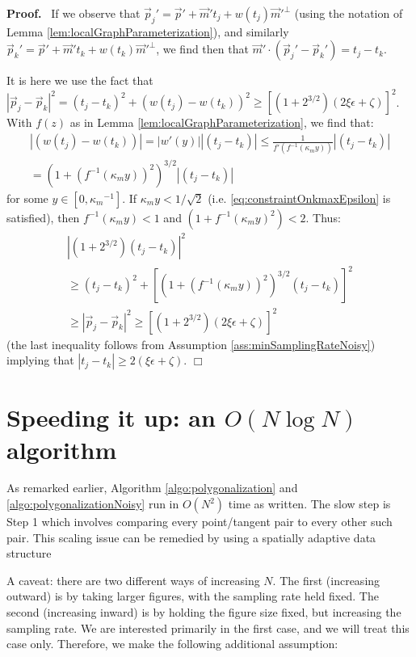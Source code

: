 \documentclass{article}
\newenvironment{proof}{
  \noindent\textbf{Proof.}\ }{\hspace*{\fill}
  \begin{math}\Box\end{math}\medskip}
\numberwithin{cntr}{section}
\numberwithin{equation}{section}
\newcommand{\abs}[1]{\left| #1 \right|}%
\newcommand{\vp}[0]{{\vec{p}}}
\newcommand{\vm}[0]{{\vec{m}}}
\newcommand{\curvemax}{{\kappa_{m}}}
\newcommand{\curvemaxi}{{\curvemax^{-1}}}
\newcommand{\pointNoise}{{\zeta}}
\newcommand{\tanNoise}{{\xi}}
\begin{document}
\begin{proof}
If we observe that $\vp_{j}' = \vp' + \vm' t_{j} + w(t_{j}) \vm'^{\perp}$ (using the notation of Lemma \ref{lem:localGraphParameterization}), and similarly $\vp_{k}' = \vp' + \vm' t_{k} + w(t_{k}) \vm'^{\perp}$, we find then that $\vm' \cdot (\vp_{j}'-\vp_{k}') = t_{j}-t_{k}$.

It is here we use the fact that $\abs{\vp_{j} - \vp_{k}}^{2} = (t_{j}-t_{k})^{2} + (w(t_{j})-w(t_{k}))^{2} \geq [(1+2^{3/2})(2 \tanNoise \epsilon + \pointNoise)]^{2}$. With $f(z)$ as in Lemma \ref{lem:localGraphParameterization}, we find that:
\begin{multline*}
  \abs{(w(t_{j})-w(t_{k}))} = \abs{w'(y)}\abs{(t_{j}-t_{k})} \leq \frac{1}{f'(f^{-1}(\curvemax y))} \abs{(t_{j}-t_{k})} \\
  = (1+(f^{-1}(\curvemax y))^{2})^{3/2} \abs{(t_{j}-t_{k} )}
\end{multline*}
for some $y \in [0,\curvemaxi]$. If $\curvemax y < 1/\sqrt{2}$ (i.e. \eqref{eq:constraintOnkmaxEpsilon} is satisfied), then $f^{-1}(\curvemax y) < 1$ and $(1+f^{-1}(\curvemax y)^{2}) < 2$. Thus:
\begin{multline}
  \abs{(1+2^{3/2})(t_{j}-t_{k})}^{2} \\
  \geq (t_{j}-t_{k})^{2} + [(1+(f^{-1}(\curvemax y))^{2})^{3/2} (t_{j}-t_{k} )]^{2} \\
  \geq \abs{\vp_{j} - \vp_{k}}^{2}  \geq [(1+2^{3/2})(2 \tanNoise \epsilon + \pointNoise)]^{2}
\end{multline}
(the last inequality follows from Assumption \ref{ass:minSamplingRateNoisy}) implying that $\abs{t_{j}-t_{k}} \geq 2(\tanNoise \epsilon + \pointNoise)$.
\end{proof}


\section{Speeding it up: an $O(N \log N)$ algorithm}
\label{sec:quadTreeSection}

As remarked earlier, Algorithm \ref{algo:polygonalization} and \ref{algo:polygonalizationNoisy} run in $O(N^{2})$ time as written. The slow step is Step 1 which involves comparing every point/tangent pair to every other such pair. This scaling issue can be remedied by using a spatially adaptive data structure
\cite{quadtrees}

A caveat: there are two different ways of increasing $N$. The first (increasing outward) is by taking larger figures, with the sampling rate held fixed. The second (increasing inward) is by holding the figure size fixed, but increasing the sampling rate. We are interested primarily in the first case, and we will treat this case only. Therefore, we make the following additional assumption:
\end{document}
